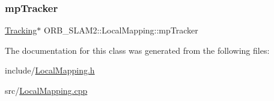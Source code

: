 \mbox{\label{class_o_r_b___s_l_a_m2_1_1_local_mapping_a6b4d311f49979f38d47ed96290255a2f}} 
\subsubsection{\texorpdfstring{mp\+Tracker}{mpTracker}}
{\footnotesize\ttfamily \mbox{\hyperlink{class_o_r_b___s_l_a_m2_1_1_tracking}{Tracking}}$\ast$ O\+R\+B\+\_\+\+S\+L\+A\+M2\+::\+Local\+Mapping\+::mp\+Tracker\hspace{0.3cm}{\ttfamily [protected]}}



The documentation for this class was generated from the following files\+:\begin{DoxyCompactItemize}
\item 
include/\mbox{\hyperlink{_local_mapping_8h}{Local\+Mapping.\+h}}\item 
src/\mbox{\hyperlink{_local_mapping_8cpp}{Local\+Mapping.\+cpp}}\end{DoxyCompactItemize}
